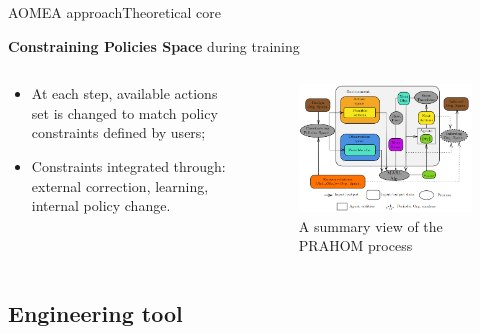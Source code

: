 \begin{frame}{AOMEA approach}{Theoretical core}

    \textbf{Constraining Policies Space} during training

    \begin{columns}

        \begin{column}{0.3\textwidth}

            \begin{itemize}
                \item At each step, available actions set is changed to match policy constraints defined by users;
                \item Constraints integrated through: external correction, learning, internal policy change.
            \end{itemize}

        \end{column}

        \begin{column}{0.8\textwidth}
            \begin{figure}
                \centering
                \includegraphics[width=0.7\linewidth]{figures/prahom_view.png}
                \caption{A summary view of the PRAHOM process}
                \label{fig:prahom_process}
            \end{figure}
        \end{column}

    \end{columns}

\end{frame}

\subsection{Engineering tool}

